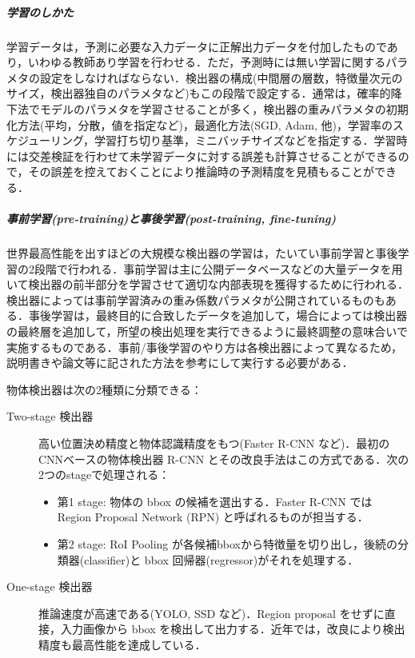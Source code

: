 \documentclass[twocolumn]{jsarticle} %
\begin{document}
\subparagraph{学習のしかた}学習データは，予測に必要な入力データに正解出力データを付加したものであり，いわゆる教師あり学習を行わせる．ただ，予測時には無い学習に関するパラメタの設定をしなければならない．検出器の構成(中間層の層数，特徴量次元のサイズ，検出器独自のパラメタなど)もこの段階で設定する．通常は，確率的降下法でモデルのパラメタを学習させることが多く，検出器の重みパラメタの初期化方法(平均，分散，値を指定など)，最適化方法(SGD, Adam, 他)，学習率のスケジューリング，学習打ち切り基準，ミニバッチサイズなどを指定する．学習時には交差検証を行わせて未学習データに対する誤差も計算させることができるので，その誤差を控えておくことにより推論時の予測精度を見積もることができる．

\subparagraph{事前学習(pre-training)と事後学習(post-training, fine-tuning)}世界最高性能を出すほどの大規模な検出器の学習は，たいてい事前学習と事後学習の2段階で行われる．事前学習は主に公開データベースなどの大量データを用いて検出器の前半部分を学習させて適切な内部表現を獲得するために行われる．検出器によっては事前学習済みの重み係数パラメタが公開されているものもある．事後学習は，最終目的に合致したデータを追加して，場合によっては検出器の最終層を追加して，所望の検出処理を実行できるように最終調整の意味合いで実施するものである．事前/事後学習のやり方は各検出器によって異なるため，説明書きや論文等に記された方法を参考にして実行する必要がある．

物体検出器は次の2種類に分類できる\cite{JZLYLFQ19}：
\begin{description}
    \item[Two-stage 検出器] 高い位置決め精度と物体認識精度をもつ(Faster R-CNN など)．最初のCNNベースの物体検出器 R-CNN とその改良手法はこの方式である．次の2つのstageで処理される：
    \begin{itemize}
        \item 第1 stage: 物体の bbox の候補を選出する．Faster R-CNN では Region Proposal Network (RPN) と呼ばれるものが担当する．
        \item 第2 stage: RoI Pooling が各候補bboxから特徴量を切り出し，後続の分類器(classifier)と bbox 回帰器(regressor)がそれを処理する．
    \end{itemize}
    \item[One-stage 検出器] 推論速度が高速である(YOLO\cite{RedFar18,BWL20}, SSD\cite{LAESRFB16} など)．Region proposal をせずに直接，入力画像から bbox を検出して出力する．近年では，改良により検出精度も最高性能を達成している．
\end{description}
\end{document}
